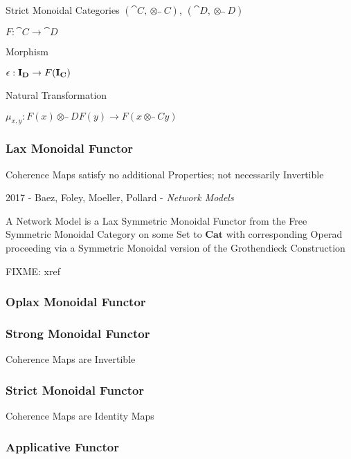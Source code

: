 Strict Monoidal Categories $(\cat{C},\otimes_\cat{C})$,
$(\cat{D},\otimes_\cat{D})$

$F : \cat{C} \rightarrow \cat{D}$

Morphism

$\epsilon : \mathbf{I}_\mathbf{D} \rightarrow F(\mathbf{I}_\mathbf{C})$

Natural Transformation

$\mu_{x,y} : F(x) \otimes_\cat{D} F(y) \rightarrow F(x \otimes_\cat{C} y)$



\subsubsection{Lax Monoidal Functor}\label{sec:lax_monoidal_functor}

Coherence Maps satisfy no additional Properties; not necessarily
Invertible

2017 - Baez, Foley, Moeller, Pollard - \emph{Network Models}

A Network Model is a Lax Symmetric Monoidal Functor from the Free Symmetric
Monoidal Category on some Set to $\mathbf{Cat}$ with corresponding Operad
proceeding via a Symmetric Monoidal version of the Grothendieck Construction

FIXME: xref



\subsubsection{Oplax Monoidal Functor}\label{sec:oplax_monoidal_functor}

\subsubsection{Strong Monoidal Functor}\label{sec:strong_monoidal_functor}

Coherence Maps are Invertible



\subsubsection{Strict Monoidal Functor}\label{sec:strict_monoidal_functor}

Coherence Maps are Identity Maps



\subsubsection{Applicative Functor}\label{sec:applicative_functor}

